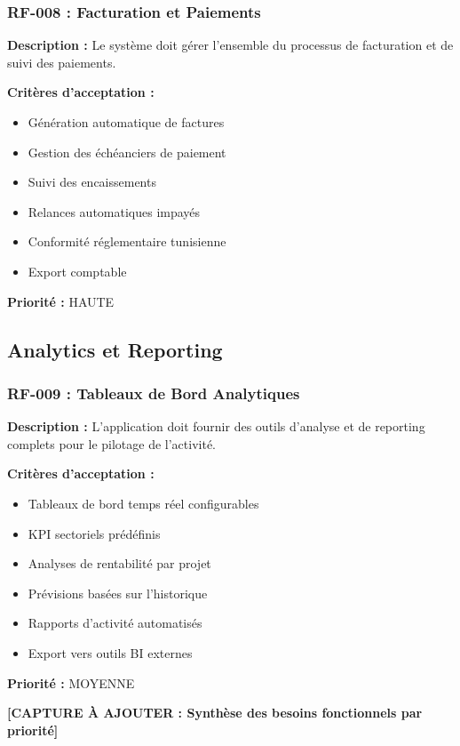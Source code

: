 \subsubsection{RF-008 : Facturation et Paiements}

\textbf{Description :} Le système doit gérer l'ensemble du processus de facturation et de suivi des paiements.

\textbf{Critères d'acceptation :}
\begin{itemize}
    \item Génération automatique de factures
    \item Gestion des échéanciers de paiement
    \item Suivi des encaissements
    \item Relances automatiques impayés
    \item Conformité réglementaire tunisienne
    \item Export comptable
\end{itemize}

\textbf{Priorité :} HAUTE

\subsection{Analytics et Reporting}

\subsubsection{RF-009 : Tableaux de Bord Analytiques}

\textbf{Description :} L'application doit fournir des outils d'analyse et de reporting complets pour le pilotage de l'activité.

\textbf{Critères d'acceptation :}
\begin{itemize}
    \item Tableaux de bord temps réel configurables
    \item KPI sectoriels prédéfinis
    \item Analyses de rentabilité par projet
    \item Prévisions basées sur l'historique
    \item Rapports d'activité automatisés
    \item Export vers outils BI externes
\end{itemize}

\textbf{Priorité :} MOYENNE

\textbf{[CAPTURE À AJOUTER : Synthèse des besoins fonctionnels par priorité]}

